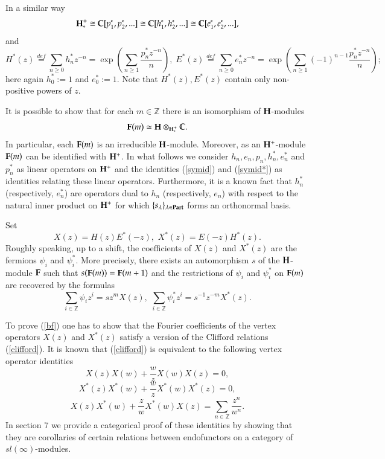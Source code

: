 \documentclass[11pt]{amsart}
\begin{document}
In a similar way   
$$\bold{H}^+_*\cong\mathbb{C}[p^*_1,p^*_2,...]\cong\mathbb{C}[h^*_1,h^*_2,...]\cong\mathbb{C}[e^*_1,e^*_2,...],$$
and 
\begin{equation}\label{symid*}
H^*(z)\stackrel{def}{=}\sum_{n\geq 0}h^*_n z^{-n}=\exp\left(\sum_{n\geq 1}\frac{p^*_n z^{-n}}{n}\right),\;
E^*(z)\stackrel{def}{=}\sum_{n\geq 0}e^*_n z^{-n}=\exp\left(\sum_{n\geq 1}(-1)^{n-1}\frac{p^*_n z^{-n}}{n}\right);
\end{equation}
here again $h^*_0:=1$ and $e^*_0:=1$. Note that $H^*(z),E^*(z)$ 
contain only non-positive powers of $z$.

It is possible to show \cite{DJKM} that for each $m\in\mathbb Z$
there is an isomorphism of $\bold{H}$-modules 
$$\bold F(m)\simeq\bold H\otimes_{\bold H_*^+}\mathbb C.$$ 
In particular, each $\bold{F}(m)$ is an irreducible
$\bold{H}$-module. Moreover, as an $\bold{H}^+$-module $\bold{F}(m)$ 
can be identified with $\bold{H}^+$.
In what follows we consider $h_n,e_n,p_n,h^*_n,e_n^*$ and $p_n^*$ as 
linear operators on $\bold{H}^+$ and the identities
(\ref{symid}) and (\ref{symid*}) as  identities relating these
linear operators. Furthermore, it is a known fact that $h_n^*$ (respectively, $e_n^*$) are operators dual to
$h_n$ (respectively, $e_n$)  with respect  to the natural inner product on $\bold{H}^+$ for which
$\{s_\lambda\}_{\lambda\in\bold{Part}}$ forms an orthonormal basis.

Set 
\begin{equation}\label{eqvert}
X(z)=H(z)E^*(-z),\,\,X^*(z)=E(-z)H^*(z).
\end{equation}
Roughly speaking, up to a shift, the coefficients of $X(z)$ and $X^*(z)$ are the
fermions $\psi_i$ and $\psi_i^*$.
More precisely, 
there exists  an automorphism $s$ of the $\bold {H}$-module $\bold{F}$ such that 
$s(\bold{F}(m))= \bold{F}(m+1)$ and the restrictions of $\psi_i$ and $\psi_i^*$ on
$\bold{F}(m)$ are recovered by the formulas
\begin{equation}\label{bf}
\sum_{i\in\mathbb Z}\psi_iz^i=sz^{m}X(z),\,\, \sum_{i\in\mathbb Z}\psi^*_iz^i=s^{-1}z^{-m}X^*(z).
\end{equation}

To prove (\ref{bf}) one has to show that the Fourier coefficients of the vertex operators
$X(z)$ and $X^*(z)$ satisfy a version of the Clifford relations  (\ref{clifford}). It is known \cite{F}
that (\ref{clifford}) is equivalent to the following vertex operator identities
\begin{equation}\label{v1}
X(z)X(w)+\frac{w}{z} X(w)X(z)=0,
\end{equation}
\begin{equation}\label{v2}
X^*(z)X^*(w)+\frac{w}{z} X^*(w)X^*(z)=0,
\end{equation}
\begin{equation}\label{v3}
X(z)X^*(w)+\frac{z}{w}X^*(w)X(z)=\sum_{n\in\mathbb Z}\frac{z^n}{w^n}.
\end{equation}
In section 7 we provide a categorical proof of these identities by showing
that they are corollaries of certain relations between endofunctors on a category
of $sl(\infty)$-modules.
\end{document}
